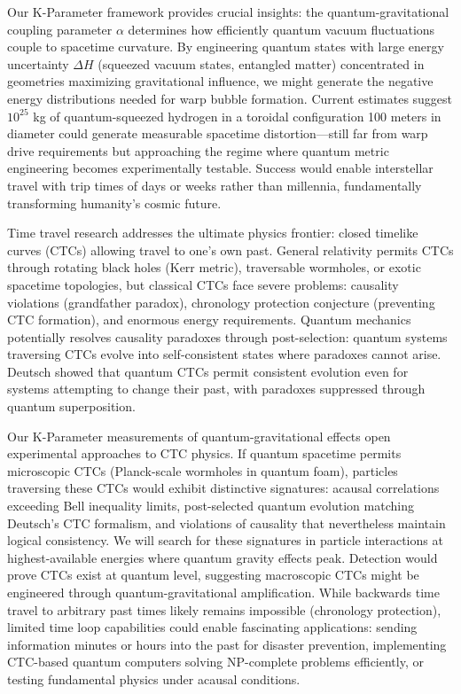 \documentclass[11pt,a4paper,twoside]{article}
\begin{document}
Our K-Parameter framework provides crucial insights: the quantum-gravitational coupling parameter $\alpha$ determines how efficiently quantum vacuum fluctuations couple to spacetime curvature. By engineering quantum states with large energy uncertainty $\Delta H$ (squeezed vacuum states, entangled matter) concentrated in geometries maximizing gravitational influence, we might generate the negative energy distributions needed for warp bubble formation. Current estimates suggest $10^{25}$ kg of quantum-squeezed hydrogen in a toroidal configuration 100 meters in diameter could generate measurable spacetime distortion---still far from warp drive requirements but approaching the regime where quantum metric engineering becomes experimentally testable. Success would enable interstellar travel with trip times of days or weeks rather than millennia, fundamentally transforming humanity's cosmic future.

Time travel research addresses the ultimate physics frontier: closed timelike curves (CTCs) allowing travel to one's own past. General relativity permits CTCs through rotating black holes (Kerr metric), traversable wormholes, or exotic spacetime topologies, but classical CTCs face severe problems: causality violations (grandfather paradox), chronology protection conjecture (preventing CTC formation), and enormous energy requirements. Quantum mechanics potentially resolves causality paradoxes through post-selection: quantum systems traversing CTCs evolve into self-consistent states where paradoxes cannot arise. Deutsch showed that quantum CTCs permit consistent evolution even for systems attempting to change their past, with paradoxes suppressed through quantum superposition.

Our K-Parameter measurements of quantum-gravitational effects open experimental approaches to CTC physics. If quantum spacetime permits microscopic CTCs (Planck-scale wormholes in quantum foam), particles traversing these CTCs would exhibit distinctive signatures: acausal correlations exceeding Bell inequality limits, post-selected quantum evolution matching Deutsch's CTC formalism, and violations of causality that nevertheless maintain logical consistency. We will search for these signatures in particle interactions at highest-available energies where quantum gravity effects peak. Detection would prove CTCs exist at quantum level, suggesting macroscopic CTCs might be engineered through quantum-gravitational amplification. While backwards time travel to arbitrary past times likely remains impossible (chronology protection), limited time loop capabilities could enable fascinating applications: sending information minutes or hours into the past for disaster prevention, implementing CTC-based quantum computers solving NP-complete problems efficiently, or testing fundamental physics under acausal conditions.
\end{document}
